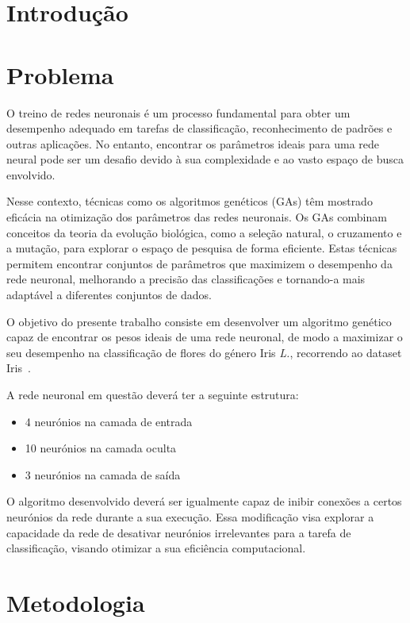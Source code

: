 \documentclass[a4paper, portuguese]{report}
\begin{document}
    \chapter{Introdução}\label{ch:introduction}
    


    \chapter{Problema}\label{ch:problem}

    O treino de redes neuronais é um processo fundamental para obter um desempenho adequado em tarefas de classificação, reconhecimento de padrões e outras aplicações.
    No entanto, encontrar os parâmetros ideais para uma rede neural pode ser um desafio devido à sua complexidade e ao vasto espaço de busca envolvido.

    Nesse contexto, técnicas como os algoritmos genéticos (GAs) têm mostrado eficácia na otimização dos parâmetros das redes neuronais.
    Os GAs combinam conceitos da teoria da evolução biológica, como a seleção natural, o cruzamento e a mutação, para explorar o espaço de pesquisa de forma eficiente.
    Estas técnicas permitem encontrar conjuntos de parâmetros que maximizem o desempenho da rede neuronal, melhorando a precisão das classificações e tornando-a mais adaptável a diferentes conjuntos de dados.

    O objetivo do presente trabalho consiste em desenvolver um algoritmo genético capaz de encontrar os pesos ideais de uma rede neuronal, de modo a maximizar o seu desempenho na classificação de flores do género Iris \textit{L.}, recorrendo ao dataset Iris~\cite{Fisher1988}.

    A rede neuronal em questão deverá ter a seguinte estrutura:
    \begin{itemize}
        \item 4 neurónios na camada de entrada
        \item 10 neurónios na camada oculta
        \item 3 neurónios na camada de saída
    \end{itemize}

    O algoritmo desenvolvido deverá ser igualmente capaz de inibir conexões a certos neurónios da rede durante a sua execução.
    Essa modificação visa explorar a capacidade da rede de desativar neurónios irrelevantes para a tarefa de classificação, visando otimizar a sua eficiência computacional.


    \chapter{Metodologia}\label{ch:methodology}
    
\end{document}
